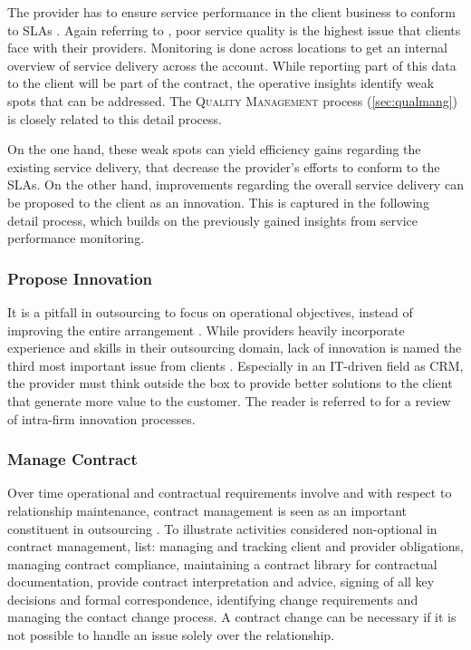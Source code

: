 	The provider has to ensure service performance in the client business to conform to \acrshort{SLA}s \citep{deloittehandbook}. Again referring to \cite{deloitte2014outsourcing}, poor service quality is the highest issue that clients face with their providers. Monitoring is done across locations to get an internal overview of service delivery across the account. While reporting part of this data to the client will be part of the contract, the operative insights identify weak spots that can be addressed. The \textsc{Quality Management} process (\ref{sec:qualmang}) is closely related to this detail process. 
	
	On the one hand, these weak spots can yield efficiency gains regarding the existing service delivery, that decrease the provider's efforts to conform to the \acrshort{SLA}s. On the other hand, improvements regarding the overall service delivery can be proposed to the client as an innovation. This is captured in the following detail process, which builds on the previously gained insights from service performance monitoring. 
	
	\subsubsection{Propose Innovation}
	
	It is a pitfall in outsourcing to focus on operational objectives, instead of improving the entire arrangement \citep{deloittehandbook}. While providers heavily incorporate experience and skills in their outsourcing domain, lack of innovation is named the third most important issue from clients \citep{deloitte2014outsourcing}. Especially in an IT-driven field as \acrshort{CRM}, the provider must think outside the box to provide better solutions to the client that generate more value to the customer. The reader is referred to \citep{Saren_1984} for a review of intra-firm innovation processes. 
	
	\subsubsection{Manage Contract}
	
	Over time operational and contractual requirements involve and with respect to relationship maintenance, contract management is seen as an important constituent in outsourcing \citep{Franceschini_2003, perunovic2007outsourcing}. To illustrate activities considered non-optional in contract management, \citep[]{deloittehandbook} list: managing and tracking client and provider obligations, managing contract compliance, maintaining a contract library for contractual documentation, provide contract interpretation and advice, signing of all key decisions and formal correspondence, identifying change requirements and managing the contact change process. A contract change can be necessary if it is not possible to handle an issue solely over the relationship. 
	
